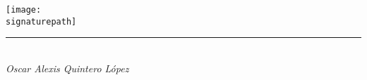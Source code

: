 \vspace*{\fill} %
\noindent
\begin{flushright}
    \texttt{[image: \\signaturepath]}\\[-1ex]
    \vspace*{-0.6cm} %
    \rule{4.5cm}{1pt}\\
    \textit{Oscar Alexis Quintero López}\\
    \vspace*{4mm}
    \end{flushright}
